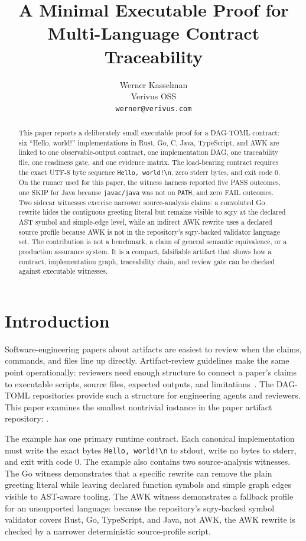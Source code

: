 \documentclass[11pt,letterpaper]{article}
\title{\bfseries A Minimal Executable Proof for Multi-Language Contract Traceability}
\author{Werner Kasselman\\Verivus OSS\\\texttt{werner@verivus.com}}
\date{}
\newcommand{\dagtoml}{DAG-TOML}
\newcommand{\hellobytes}{\texttt{Hello, world!\textbackslash n}}
\begin{document}
\maketitle

\begin{abstract}
This paper reports a deliberately small executable proof for a
\dagtoml{} contract: six ``Hello, world!'' implementations in Rust, Go,
C, Java, TypeScript, and AWK are linked to one observable-output
contract, one implementation DAG, one traceability file, one readiness
gate, and one evidence matrix. The load-bearing contract requires the
exact UTF-8 byte sequence \hellobytes{}, zero stderr bytes, and exit
code 0. On the runner used for this paper, the witness harness reported
five PASS outcomes, one SKIP for Java because \texttt{javac/java} was
not on \texttt{PATH}, and zero FAIL outcomes. Two sidecar witnesses
exercise narrower source-analysis claims: a convoluted Go rewrite hides
the contiguous greeting literal but remains visible to sqry at the
declared AST symbol and simple-edge level, while an indirect AWK
rewrite uses a declared source profile because AWK is not in the
repository's sqry-backed validator language set. The contribution is
not a benchmark, a claim of general semantic equivalence, or a
production assurance system. It is a compact, falsifiable artifact that
shows how a contract, implementation graph, traceability chain, and
review gate can be checked against executable witnesses.
\end{abstract}

\section{Introduction}

Software-engineering papers about artifacts are easiest to review when
the claims, commands, and files line up directly. Artifact-review
guidelines make the same point operationally: reviewers need enough
structure to connect a paper's claims to executable scripts, source
files, expected outputs, and limitations~\cite{acmBadging2020,poplArtifact2023}.
The \dagtoml{} repositories provide such a structure for engineering
agents and reviewers. This paper examines the smallest nontrivial
instance in the paper artifact repository:
.

The example has one primary runtime contract. Each canonical
implementation must write the exact bytes \hellobytes{} to stdout,
write no bytes to stderr, and exit with code 0. The example also
contains two source-analysis witnesses. The Go witness demonstrates
that a specific rewrite can remove the plain greeting literal while
leaving declared function symbols and simple graph edges visible to
AST-aware tooling. The AWK witness demonstrates a fallback profile for
an unsupported language: because the repository's sqry-backed symbol
validator covers Rust, Go, TypeScript, and Java, not AWK, the AWK
rewrite is checked by a narrower deterministic source-profile script.
\end{document}
